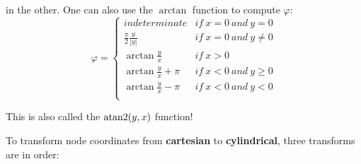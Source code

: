  in the other. One can also use the $ \arctan $ function to compute $ \varphi $:
 \begin{equation}
     \varphi = \left\{ \begin{array}{cc}
             indeterminate & if\ x = 0\ and\ y = 0 \\
             \frac{\pi}{2}\frac{y}{|y|} & if\ x = 0\ and\ y \ne 0 \\
             \arctan \frac{y}{x} & if\ x > 0 \\
             \arctan \frac{y}{x} + \pi & if\ x < 0\ and\ y \ge 0 \\
             \arctan \frac{y}{x} - \pi & if\ x < 0\ and\ y < 0 \\
         \end{array} \right.
 \end{equation}

 This is also called the $ \operatorname{atan2} (y, x) $ function!

 To transform node coordinates from \textbf{cartesian} to \textbf{cylindrical},
 three transforms are in order:

